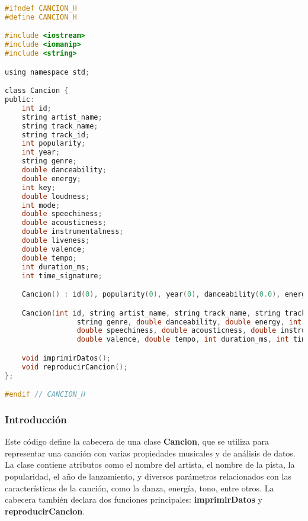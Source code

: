 \documentclass[12pt]{article}
\begin{document}
\begin{flushleft}
            \begin{lstlisting}[language=C, style=mystyle, caption={Cabecera de la Clase Canción}]
#ifndef CANCION_H
#define CANCION_H

#include <iostream>
#include <iomanip>
#include <string>

using namespace std;

class Cancion {
public:
    int id;
    string artist_name;
    string track_name;
    string track_id;
    int popularity;
    int year;
    string genre;
    double danceability;
    double energy;
    int key;
    double loudness;
    int mode;
    double speechiness;
    double acousticness;
    double instrumentalness;
    double liveness;
    double valence;
    double tempo;
    int duration_ms;
    int time_signature;

    Cancion() : id(0), popularity(0), year(0), danceability(0.0), energy(0.0), key(0), loudness(0.0), mode(0), speechiness(0.0), acousticness(0.0), instrumentalness(0.0), liveness(0.0), valence(0.0), tempo(0.0), duration_ms(0), time_signature(0) {}

    Cancion(int id, string artist_name, string track_name, string track_id, int popularity, int year,
                 string genre, double danceability, double energy, int key, double loudness, int mode,
                 double speechiness, double acousticness, double instrumentalness, double liveness,
                 double valence, double tempo, int duration_ms, int time_signature);

    void imprimirDatos();
    void reproducirCancion();
};

#endif // CANCION_H
            \end{lstlisting}

            \subsubsection{Introducción}
            
                \noindent\hspace*{4em}Este código define la cabecera de una clase \textbf{Cancion}, que se utiliza para representar una canción con varias propiedades musicales y de análisis de datos. La clase contiene atributos como el nombre del artista, el nombre de la pista, la popularidad, el año de lanzamiento, y diversos parámetros relacionados con las características de la canción, como la danza, energía, tono, entre otros. La cabecera también declara dos funciones principales: \textbf{imprimirDatos} y \textbf{reproducirCancion}.
            

\end{flushleft}
\end{document}
